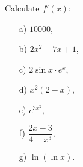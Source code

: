         
        





\bigskip

\begin{problem}
Calculate $f'(x)$:
    \begin{enumerate}
    \item[a) ] $10000$,

        \item[b) ] $2x^2-7x+1$,
        
        \item[c) ] $2\sin x \cdot e^x$,
        
        \item[d) ] $x^2(2-x)$,
        \item[e) ] $e^{3x^2}$,
        \item[f) ] $\dfrac{2x-3}{4-x^3}$,
        \item[g) ] $\ln(\ln x)$.
    \end{enumerate}
\end{problem}

\bigskip

